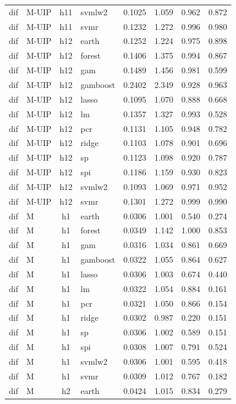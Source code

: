 \begin{ThreePartTable}
\begin{longtable}[t]{llclcccc}
dif & M-UIP & h11 & svmlw2 & 0.1025 & 1.059 & 0.962 & 0.872\\
dif & M-UIP & h11 & svmr & 0.1232 & 1.272 & 0.996 & 0.980\\
\addlinespace
dif & M-UIP & h12 & earth & 0.1252 & 1.224 & 0.975 & 0.898\\
dif & M-UIP & h12 & forest & 0.1406 & 1.375 & 0.994 & 0.867\\
dif & M-UIP & h12 & gam & 0.1489 & 1.456 & 0.981 & 0.599\\
dif & M-UIP & h12 & gamboost & 0.2402 & 2.349 & 0.928 & 0.963\\
dif & M-UIP & h12 & lasso & 0.1095 & 1.070 & 0.888 & 0.668\\
dif & M-UIP & h12 & lm & 0.1357 & 1.327 & 0.993 & 0.528\\
dif & M-UIP & h12 & pcr & 0.1131 & 1.105 & 0.948 & 0.782\\
dif & M-UIP & h12 & ridge & 0.1103 & 1.078 & 0.901 & 0.696\\
dif & M-UIP & h12 & sp & 0.1123 & 1.098 & 0.920 & 0.787\\
dif & M-UIP & h12 & spi & 0.1186 & 1.159 & 0.930 & 0.823\\
dif & M-UIP & h12 & svmlw2 & 0.1093 & 1.069 & 0.971 & 0.952\\
dif & M-UIP & h12 & svmr & 0.1301 & 1.272 & 0.999 & 0.990\\
\addlinespace
dif & M & h1 & earth & 0.0306 & 1.001 & 0.540 & 0.274\\
dif & M & h1 & forest & 0.0349 & 1.142 & 1.000 & 0.853\\
dif & M & h1 & gam & 0.0316 & 1.034 & 0.861 & 0.669\\
dif & M & h1 & gamboost & 0.0322 & 1.055 & 0.864 & 0.627\\
dif & M & h1 & lasso & 0.0306 & 1.003 & 0.674 & 0.440\\
dif & M & h1 & lm & 0.0322 & 1.054 & 0.884 & 0.161\\
dif & M & h1 & pcr & 0.0321 & 1.050 & 0.866 & 0.154\\
dif & M & h1 & ridge & 0.0302 & 0.987 & 0.220 & 0.151\\
dif & M & h1 & sp & 0.0306 & 1.002 & 0.589 & 0.151\\
dif & M & h1 & spi & 0.0308 & 1.007 & 0.791 & 0.524\\
dif & M & h1 & svmlw2 & 0.0306 & 1.001 & 0.595 & 0.418\\
dif & M & h1 & svmr & 0.0309 & 1.012 & 0.767 & 0.182\\
\addlinespace
dif & M & h2 & earth & 0.0424 & 1.015 & 0.834 & 0.279\\

\end{longtable}
\end{ThreePartTable}
